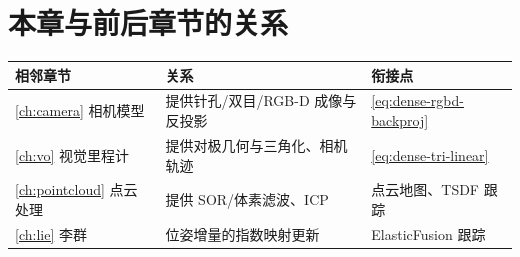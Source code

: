 \section*{本章与前后章节的关系}
\begin{table}[H]\centering\small
\begin{tabular}{lll}
\toprule
相邻章节 & 关系 & 衔接点 \\
\midrule
\cref{ch:camera} 相机模型 & 提供针孔/双目/RGB-D 成像与反投影 & \cref{eq:dense-rgbd-backproj} \\
\cref{ch:vo} 视觉里程计 & 提供对极几何与三角化、相机轨迹 & \cref{eq:dense-tri-linear} \\
\cref{ch:pointcloud} 点云处理 & 提供 SOR/体素滤波、ICP & 点云地图、TSDF 跟踪 \\
\cref{ch:lie} 李群 & 位姿增量的指数映射更新 & ElasticFusion 跟踪 \\
\bottomrule
\end{tabular}
\end{table}

